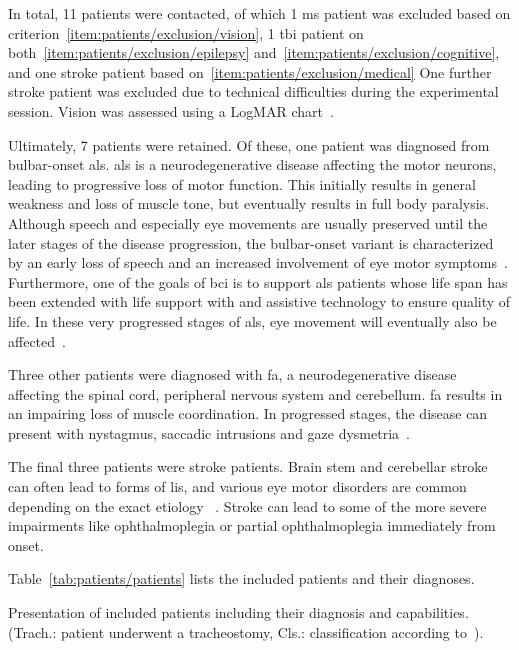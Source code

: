 In total, 11 patients were contacted, of which 1 \ac{ms} patient was excluded based on
criterion~\ref{item:patients/exclusion/vision}, 1 \ac{tbi} patient on
both~\ref{item:patients/exclusion/epilepsy}
and~\ref{item:patients/exclusion/cognitive}, and one stroke patient based
on~\ref{item:patients/exclusion/medical}
One further stroke patient was excluded due to technical
difficulties during the experimental session.
Vision was assessed using a LogMAR chart~\cite{Bailey1976}.

Ultimately, 7 patients were retained.
Of these, one patient was diagnosed from bulbar-onset \ac{als}.
\ac{als} is a neurodegenerative disease affecting the motor neurons, leading to
progressive loss of motor function.
This initially results in general weakness and loss of muscle tone, but
eventually results in full body paralysis.
Although speech and especially eye movements are usually preserved until the
later stages of the disease progression, the bulbar-onset variant is
characterized by an early loss of speech and an increased involvement of eye
motor symptoms~\cite{Guo2022}.
Furthermore, one of the goals of \ac{bci} is to support \ac{als} patients whose
life span has been extended with life support with and assistive technology to
ensure quality of life.
In these very progressed stages of \ac{als}, eye movement will eventually also
be affected~\cite{Hayashi1991}.

Three other patients were diagnosed with \ac{fa}, a neurodegenerative
disease affecting the
spinal cord, peripheral nervous system and cerebellum.
\ac{fa} results in an impairing loss of muscle coordination.
In progressed stages, the disease can present with nystagmus, saccadic
intrusions and gaze dysmetria~\cite{Cook2017}.

The final three patients were stroke patients.
Brain stem and cerebellar stroke can often lead to forms of \ac{lis}, and
various eye motor disorders are common depending on the exact etiology
~\cite{Bogousslavsky1987, Moncayo2009}.
Stroke can lead to some of the more severe impairments like ophthalmoplegia or
partial ophthalmoplegia immediately from onset.

Table~\ref{tab:patients/patients} lists the included patients and their
diagnoses.


\begin{table}[t]
  \centering
  \footnotesize
  
  \caption[Presentation of included patients including their diagnosis and
  capabilities.]{Presentation of included patients including their diagnosis and
  capabilities.
  (Trach.: patient underwent a tracheostomy, Cls.: classification according
  to~\textcite{Wolpaw2006}).
  }
  \label{tab:patients/patients}
\end{table}

